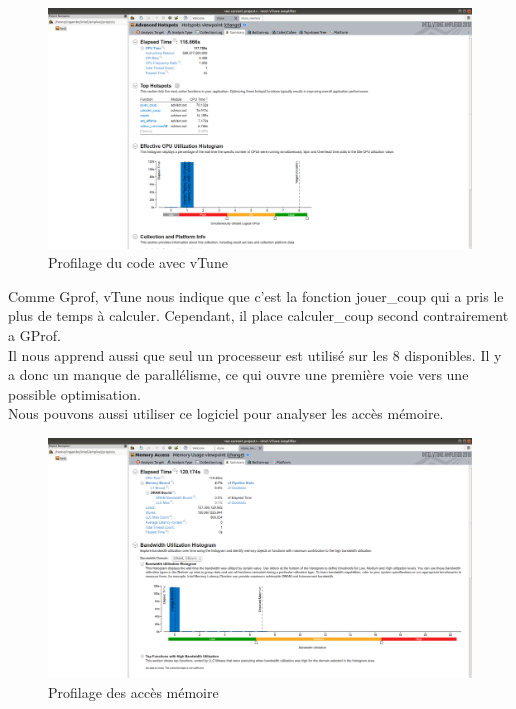\documentclass[
 aip,
 jmp,
 amsmath,amssymb,
 reprint
]{revtex4-1}
\begin{document}
\begin{figure}[H]
  \includegraphics[width=\linewidth, keepaspectratio=true]{vtune.png}
  \caption{Profilage du code avec vTune\label{Fig:vTune_sequentiel_cpu}}
\end{figure}

Comme Gprof, vTune nous indique que c'est la fonction jouer\_coup qui a pris le plus de temps à calculer. Cependant, il place calculer\_coup second contrairement a GProf.\\
Il nous apprend aussi que seul un processeur est utilisé sur les 8 disponibles. Il y a donc un manque de parallélisme, ce qui ouvre une première voie vers une possible optimisation.\\
Nous pouvons aussi utiliser ce logiciel pour analyser les accès mémoire.\\

\begin{figure}[H]
  \includegraphics[width=\linewidth, keepaspectratio=true]{memory_vtune.png}
  \caption{Profilage des accès mémoire\label{Fig:vTune_sequentiel_mem}}
\end{figure}
\end{document}
